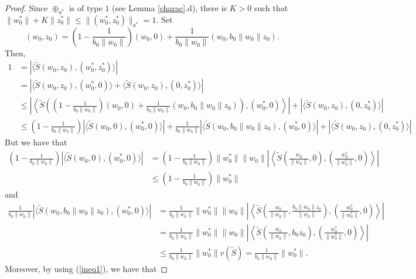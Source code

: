 \documentclass[10pt,a4paper]{amsart}
\theoremstyle{plain}
\theoremstyle{definition}
\renewcommand{\leq}{\leqslant}
\begin{document}
\begin{proof}
\noindent
Since $\oplus_{a^*}$ is of type $1$ (see Lemma \ref{charac}.d), there is $K > 0$ such that $\|w_0^*\| + K \|z_0^*\| \leq \|(w_0^*, z_0^*) \|_{a^*} = 1$. Set
\begin{equation*}
(w_0, z_0) = \left(1 - \frac{1}{b_0 \|w_0\|} \right) (w_0, 0) + \frac{1}{b_0 \|w_0\|} (w_0, b_0 \|w_0\| z_0).	
\end{equation*}
Then,
\begin{align*}
1 &= | \langle \widetilde{S}(w_0, z_0), (w_0^*, z_0^*) \rangle | \\
&= | \langle \widetilde{S}(w_0, z_0), (w_0^*, 0) \rangle + \langle \widetilde{S}(w_0, z_0), (0, z_0^*) \rangle | \\
&\leq \left|  \left \langle \widetilde{S} \left( \left( 1 - \frac{1}{b_0 \|w_0\|} \right) (w_0, 0) + \frac{1}{b_0 \|w_0\|}  (w_0, b_0 \|w_0\| z_0) \right), (w_0^*, 0) \right \rangle \right| + |\langle \widetilde{S}(w_0, z_0), (0, z_0^*) \rangle | \\
&\leq \left( 1 - \frac{1}{b_0 \|w_0\|} \right) | \langle \widetilde{S} (w_0, 0), (w_0^*, 0) \rangle| + \frac{1}{b_0 \|w_0\|} | \langle \widetilde{S}(w_0, b_0 \|w_0\| z_0), (w_0^*, 0) \rangle| + |\langle \widetilde{S}(w_0, z_0), (0, z_0^*) \rangle |
\end{align*}
But we have that
\begin{align*}
\left( 1 - \frac{1}{b_0 \|w_0\|} \right) | \langle \widetilde{S} (w_0, 0), (w_0^*, 0) \rangle| &= \left( 1 - \frac{1}{b_0 \|w_0\|} \right) \|w_0^*\|\|w_0\| \left| \left\langle \widetilde{S} \left( \frac{w_0}{\|w_0\|}, 0\right), \left(\frac{w_0^*}{\|w_0^*\|}, 0 \right) \right\rangle \right| \\
&\leq\left( 1 - \frac{1}{b_0 \|w_0\|} \right) \|w_0^*\|
\end{align*}
and
\begin{align*}
\frac{1}{b_0 \|w_0\|} | \langle \widetilde{S}(w_0, b_0 \|w_0\| z_0), (w_0^*, 0) \rangle | &= \frac{1}{b_0 \|w_0\|} \|w_0^*\|\|w_0\| \left| \left \langle \widetilde{S} \left( \frac{w_0}{\|w_0\|}, \frac{b_0 \|w_0\| z_0}{\|w_0\|} \right), \left( \frac{w_0^*}{\|w_0^*\|}, 0 \right) \right \rangle \right| \\
&= \frac{1}{b_0 \|w_0\|} \|w_0^*\|\|w_0\| \left| \left \langle \widetilde{S} \left( \frac{w_0}{\|w_0\|}, b_0 z_0 \right), \left( \frac{w_0^*}{\|w_0^*\|}, 0 \right) \right \rangle \right| \\
&\leq	\frac{1}{b_0 \|w_0\|}\|w_0^*\| v(\widetilde{S}) = \frac{1}{b_0 \|w_0\|}\|w_0^*\|.
\end{align*}
Moreover, by using (\ref{ineq1}), we have that

\end{proof}
\end{document}
